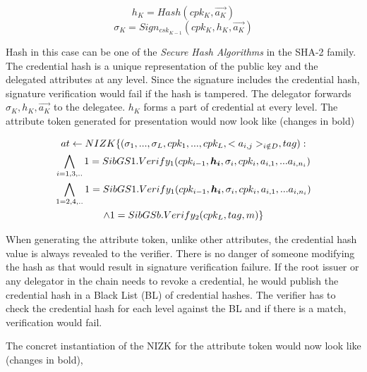 \documentclass[journal]{IEEEtran}
\begin{document}
$$
h_K = Hash(cpk_K,\overrightarrow{a_K})
$$
$$
\sigma_K = Sign_{csk_{K-1}}(cpk_K,h_K,\overrightarrow{a_K})
$$

Hash in this case can be one of the \textit{Secure Hash Algorithms} in the SHA-2 family. The credential hash is a unique representation of the public key and the delegated attributes at any level. Since the signature includes the credential hash, signature verification would fail if the hash is tampered. The delegator forwards $\sigma_K, h_K, \overrightarrow{a_K}$ to the delegatee. $h_K$ forms a part of credential at every level. The attribute token generated for presentation would now look like (changes in bold)

\begin{multline}
$$
at \leftarrow NIZK \lbrace(\sigma_1,...,\sigma_L,cpk_1,...,cpk_L,<a_{i,j}>_{i \notin D},tag) : \\ 
\bigwedge \limits _{i=1,3,..} 1 = SibGS1.Verify_1(cpk_{i-1}, \boldsymbol{h_i}, \sigma_i,cpk_i,a_{i,1},...a_{i,n_i})\\
\bigwedge \limits _{1=2,4,..} 1 = SibGS1.Verify_1(cpk_{i-1}, \boldsymbol{h_i},\sigma_i,cpk_i,a_{i,1},...a_{i,n_i})\\
\wedge 1 = SibGSb.Verify_2(cpk_L,tag,m)\rbrace
$$
\end{multline}

When generating the attribute token, unlike other attributes, the credential hash value is always revealed to the verifier. There is no danger of someone modifying the hash as that would result in signature verification failure. If the root issuer or any delegator in the chain needs to revoke a credential, he would publish the credential hash in a Black List (BL) of credential hashes. The verifier has to check the credential hash for each level against the BL and if there is a match, verification would fail.

The concret instantiation of the NIZK for the attribute token would now look like (changes in bold),
\end{document}
